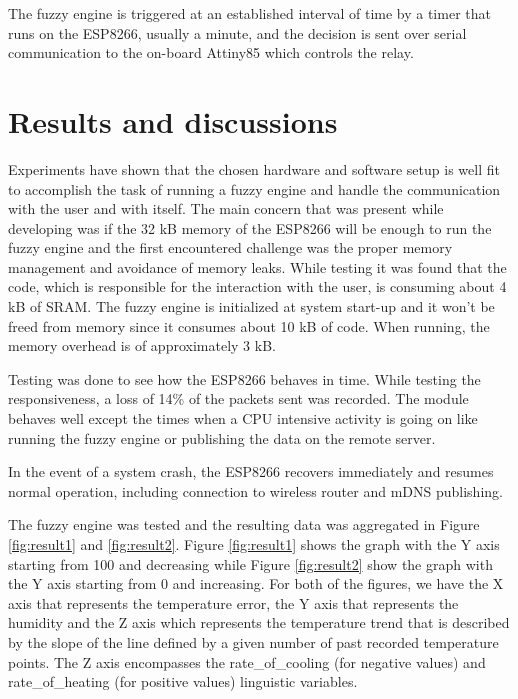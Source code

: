 \documentclass[conference]{IEEEtran}
\let\Oldsection\section
\renewcommand{\section}{\FloatBarrier\Oldsection}
\begin{document}
The fuzzy engine is triggered at an established interval of time by a timer that runs on the ESP8266, usually
a minute, and the decision is sent over serial communication to the on-board Attiny85 which controls the relay.

\section{Results and discussions}
\label{Results and discussions}

Experiments have shown that the chosen hardware and software setup is well fit to accomplish the task of
running a fuzzy engine and handle the communication with the user and with itself.
The main concern that was present while developing was if the 32 kB memory of the ESP8266 will be enough to run
the fuzzy engine and the first encountered challenge was the proper memory management and avoidance of memory leaks.
While testing it was found that the  code, which is responsible for the interaction with
the user, is consuming about 4 kB of SRAM.
The fuzzy engine is initialized at system start-up and it won't be freed from memory since it consumes about 10 kB of code. When running, the memory overhead is of approximately 3 kB.

Testing was done to see how the ESP8266 behaves in time. While testing the responsiveness, a
loss of 14\% of the packets sent was recorded. The module behaves well except the times when a CPU intensive activity is going on like running the fuzzy engine or publishing the data on the remote server.

In the event of a system crash, the ESP8266 recovers immediately and resumes normal operation, including connection
to wireless router and mDNS publishing.

The fuzzy engine was tested and the resulting data was aggregated in Figure \ref{fig:result1} and
\ref{fig:result2}. Figure \ref{fig:result1} shows the graph with the Y axis starting from 100 and decreasing
while Figure \ref{fig:result2} show the graph with the Y axis starting from 0 and increasing.
For both of the figures, we have the X axis that represents the temperature error, the Y axis that represents
the humidity and the Z axis which represents the temperature trend that is described by the slope of the
line defined by a given number of past recorded temperature points. The Z axis encompasses the
rate\_of\_cooling (for negative values) and rate\_of\_heating (for positive values) linguistic variables.
\end{document}
